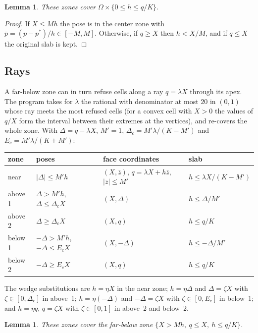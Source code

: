 \documentclass[11pt]{amsart}
\newtheorem{lemma}[theorem]{Lemma}
\theoremstyle{definition}
\theoremstyle{remark}
\begin{document}
\begin{lemma}\label{lem:corner2}
These zones cover $\Omega\times\{0\le h\le q/K\}$.
\end{lemma}

\begin{proof}
If $X\le Mh$ the pose is in the center zone with $\bar p=(p-p^*)/h\in[-M,M]$. Otherwise, if $q\ge X$ then $h<X/M$,
and if $q\le X$ the original slab is kept.
\end{proof}

\subsection{Rays}
A far-below zone can in turn refuse cells along a ray $q=\lambda X$ through its apex. The program takes for
$\lambda$ the rational with denominator at most $20$ in $(0,1)$ whose ray meets the most refused cells (for a convex
cell with $X>0$ the values of $q/X$ form the interval between their extremes at the vertices), and re-covers the whole
zone. With $\Delta=q-\lambda X$, $M'=1$, $\Delta_c=M'\lambda/(K-M')$ and $E_c=M'\lambda/(K+M')$:

\begin{center}
\begin{tabular}{llll}
\toprule
zone & poses & face coordinates & slab \\
\midrule
near & $|\Delta|\le M'h$ & $(X,\bar z)$, $q=\lambda X+h\bar z$, $|\bar z|\le M'$ & $h\le\lambda X/(K-M')$\\
above 1 & $\Delta>M'h$, $\Delta\le\Delta_cX$ & $(X,\Delta)$ & $h\le\Delta/M'$\\
above 2 & $\Delta\ge\Delta_cX$ & $(X,q)$ & $h\le q/K$\\
below 1 & $-\Delta>M'h$, $-\Delta\le E_cX$ & $(X,-\Delta)$ & $h\le-\Delta/M'$\\
below 2 & $-\Delta\ge E_cX$ & $(X,q)$ & $h\le q/K$\\
\bottomrule
\end{tabular}
\end{center}
The wedge substitutions are $h=\eta X$ in the near zone; $h=\eta\Delta$ and $\Delta=\zeta X$ with
$\zeta\in[0,\Delta_c]$ in above~1; $h=\eta(-\Delta)$ and $-\Delta=\zeta X$ with $\zeta\in[0,E_c]$ in below~1; and $h=\eta q$,
$q=\zeta X$ with $\zeta\in[0,1]$ in above~2 and below~2.

\begin{lemma}\label{lem:ray}
These zones cover the far-below zone $\{X>Mh,\ q\le X,\ h\le q/K\}$.
\end{lemma}
\end{document}
